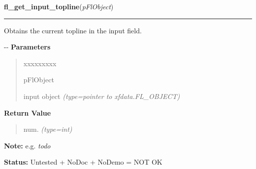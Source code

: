 \hspace{.8\funcindent}\begin{boxedminipage}{\funcwidth}

    \raggedright \textbf{fl\_get\_input\_topline}(\textit{pFlObject})

    \vspace{-1.5ex}

    \rule{\textwidth}{0.5\fboxrule}
\setlength{\parskip}{2ex}

Obtains the current topline in the input field.

-{}-
\setlength{\parskip}{1ex}
      \textbf{Parameters}
      \vspace{-1ex}

      \begin{quote}
        \begin{Ventry}{xxxxxxxxx}

          \item[pFlObject]


input object
            {\it (type=pointer to xfdata.FL\_OBJECT)}

        \end{Ventry}

      \end{quote}

      \textbf{Return Value}
    \vspace{-1ex}

      \begin{quote}

num.
      {\it (type=int)}

      \end{quote}

\textbf{Note:} 
e.g. \emph{todo}


\textbf{Status:} 
Untested + NoDoc + NoDemo = NOT OK


    \end{boxedminipage}

    \label{xformslib:flinput:fl_get_input_screenlines}

    \vspace{0.5ex}

